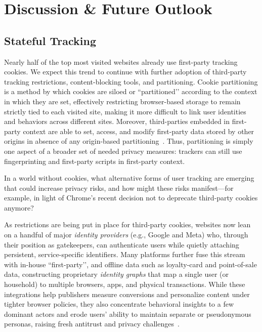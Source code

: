 \section{Discussion \& Future Outlook}
\label{sec:future-outlook}

\subsection{Stateful Tracking}
Nearly half of the top most visited websites already use first-party tracking cookies. We expect this trend to continue with further adoption of third-party tracking restrictions, content-blocking tools, and partitioning.
%
Cookie partitioning is a method by which cookies are siloed or ``partitioned’’ according to the context in which they are set, effectively restricting browser-based storage to remain strictly tied to each visited site, making it more difficult to link user identities and behaviors across different sites.
%
Moreover, third-parties embedded in first-party context are able to set, access, and modify first-party data stored by other origins in absence of any origin-based partitioning~\cite{bahramiCOOKIEGUARDCharacterizingIsolating2024}.
%
Thus, partitioning is simply one aspect of a broader set of needed privacy measures: trackers can still use fingerprinting and first-party scripts in first-party context. %

\begin{opbox}
In a world without cookies, what alternative forms of user tracking are emerging that could increase privacy risks, and how might these risks manifest---for example, in light of Chrome’s recent decision not to deprecate third-party cookies anymore?
\end{opbox}


\label{sec:id-providers}
As restrictions are being put in place for third-party cookies, websites now lean on a handful of major \emph{identity providers} (e.g., Google and Meta) who, through their position as gatekeepers, can authenticate users while quietly attaching persistent, service-specific identifiers. 
%
Many platforms further fuse this stream with in-house ``first-party’’, and offline data such as loyalty-card and point-of-sale data, constructing proprietary \emph{identity graphs} that map a single user (or household) to multiple browsers, apps, and physical transactions.
%
While these integrations help publishers measure conversions and personalize content under tighter browser policies, they also concentrate behavioral insights to a few dominant actors and erode users’ ability to maintain separate or pseudonymous personas, raising fresh antitrust and privacy challenges~\cite{TargetedAdvertisingAutorite2025,khanAmazonsAntitrustParadox2017,munirGooglesChromeAntitrust2024}.
%

